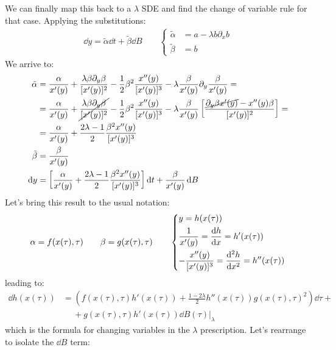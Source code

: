 \documentclass[../template.tex]{subfiles}
\begin{document}
\begin{exo}
    We can finally map this back to a $\lambda$ SDE and find the change of variable rule for that case. Applying the substitutions:
    \begin{align*}
        \dd{y} = \tilde{\alpha} \dd{t} + \tilde{\beta} \dd{B} \qquad \begin{cases}
            \tilde{\alpha} &= a-\lambda b \partial_x b\\
        \tilde{\beta} &= b
        \end{cases}
    \end{align*}
    We arrive to:
    \begin{align*}
        \tilde{\alpha} &= \frac{\alpha}{x'(y)} + \frac{\lambda \beta \partial_y \beta}{[x'(y)]^2} - \frac{1}{2} \beta^2 \frac{x''(y)}{[x'(y)]^3} - \lambda \frac{\beta}{x'(y)} \partial_y \frac{\beta}{x'(y)}  =\\
        &= \frac{\alpha}{x'(y)} + \cancel{\frac{\lambda \beta \partial_y \beta}{[x'(y)]^2}} - \frac{1}{2} \beta^2 \frac{x''(y)}{[x'(y)]^3} - \lambda \frac{\beta}{x'(y)}\left[\frac{\cancel{\partial_y \beta x'(y)} - x''(y) \beta}{[x'(y)]^2} \right] =\\
        &= \frac{\alpha}{x'(y)} +\frac{2\lambda - 1}{2} \frac{\beta^2 x''(y)}{[x'(y)]^3}\\
        \tilde{\beta} &= \frac{\beta}{x'(y)}\\
        \dd{y} &= \left[\frac{\alpha}{x'(y)} +\frac{2\lambda - 1}{2} \frac{\beta^2 x''(y)}{[x'(y)]^3}\right] \dd{t} + \frac{\beta}{x'(y)} \dd{B} 
    \end{align*}
    Let's bring this result to the usual notation:
    \begin{align*}
        \alpha = f(x(\tau), \tau) \qquad \beta = g(x(\tau),\tau) \qquad \begin{dcases}
            y = h(x(\tau))\\
            \frac{1}{x'(y)} = \dv{h}{x} = h'(x(\tau))\\
            -\frac{x''(y)}{[x'(y)]^3} = \dv[2]{h}{x} = h''(x(\tau)) 
        \end{dcases}
    \end{align*}
    leading to:
    \begin{align*}
        \dd{h(x(\tau))} &= \left(f(x(\tau),\tau) h'(x(\tau)) + \frac{1-2 \lambda}{2} h''(x(\tau)) g(x(\tau), \tau)^2\right) \dd{\tau} +\\
        &\quad \> + g(x(\tau), \tau) h'(x(\tau)) \dd{B(\tau)} \Big|_\lambda
    \end{align*}
    which is the formula for changing variables in the $\lambda$ prescription. Let's rearrange to isolate the $\dd{B}$ term:

\end{exo}
\end{document}
